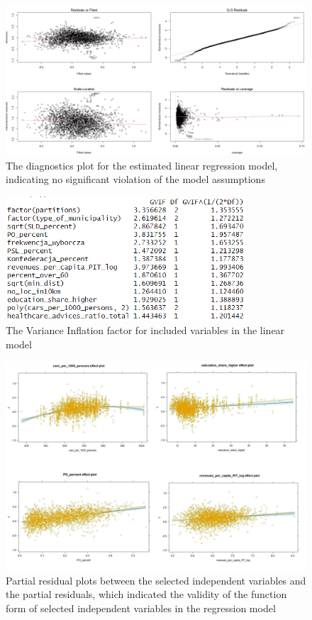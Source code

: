\documentclass[a4paper,12pt]{article} %
\begin{document}
\begin{figure}[htp]
    \centering
    \includegraphics[width=1\textwidth]{assets/diagnostics_mvp.png}
    \caption{The diagnostics plot for the estimated linear regression model, indicating no significant violation of the model assumptions}
    \label{fig:diagnostics_mvp}
\end{figure}

\begin{figure}[htp]
    \centering
    \includegraphics[width=0.8\textwidth]{assets/vif_mvp.png}
    \caption{The Variance Inflation factor for included variables in the linear model}
    \label{fig:vif_mvp}
\end{figure}

\begin{figure}[htp]
    \centering
    \includegraphics[width=1\textwidth]{assets/partial_residuals_effects.png}
    \caption{Partial residual plots between the selected independent variables and the partial residuals, which indicated the validity of the function form of selected 
    independent variables in the regression model}
    \label{fig:partial_residuals_effects}
\end{figure}
\end{document}
